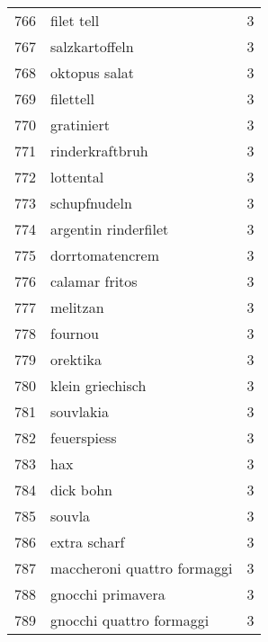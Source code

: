 \begin{tabular}{llr}
766  &                                         filet tell &      3 \\
767  &                                     salzkartoffeln &      3 \\
768  &                                      oktopus salat &      3 \\
769  &                                          filettell &      3 \\
770  &                                         gratiniert &      3 \\
771  &                                    rinderkraftbruh &      3 \\
772  &                                          lottental &      3 \\
773  &                                       schupfnudeln &      3 \\
774  &                               argentin rinderfilet &      3 \\
775  &                                    dorrtomatencrem &      3 \\
776  &                                     calamar fritos &      3 \\
777  &                                           melitzan &      3 \\
778  &                                            fournou &      3 \\
779  &                                           orektika &      3 \\
780  &                                   klein griechisch &      3 \\
781  &                                          souvlakia &      3 \\
782  &                                        feuerspiess &      3 \\
783  &                                                hax &      3 \\
784  &                                          dick bohn &      3 \\
785  &                                             souvla &      3 \\
786  &                                       extra scharf &      3 \\
787  &                        maccheroni quattro formaggi &      3 \\
788  &                                  gnocchi primavera &      3 \\
789  &                           gnocchi quattro formaggi &      3 \\

\end{tabular}

